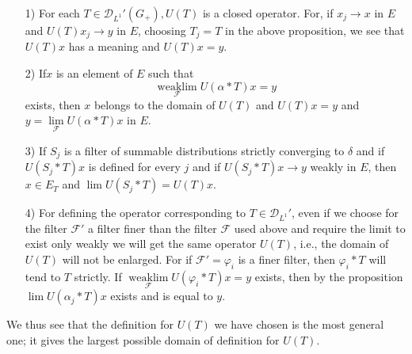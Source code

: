 \begin{itemize}
\item [1)] For each $T\in\mathscr{D}_{L^1}'(G_+), U(T)$ is a closed
  operator. For, if $x_j\to x$ in $E$ and $U(T)x_j\to y$ in $E$,
  choosing $T_j=T$ in the above proposition, we see that $U(T)x$ has a
  meaning and $U(T)x=y$. 
\item [2)] If\pageoriginale $x$ is an element of $E$ such that 
$$
\underset{\mathscr{F}}{\text{weak} \lim} U(\alpha *T)x=y
$$
exists, then $x$ belongs to the domain of $U(T)$ and $U(T)x=y$ and $y=
\lim\limits_{\mathscr{F}} U(\alpha *T)x$ in $E$. 
\item [3)] If $S_j$ is a filter of summable distributions strictly
  converging to $\delta$ and if $U(S_j*T)x$ is defined for every $j$
  and if $U(S_j*T)x\to y$ weakly in $E$, then $x\in E_T$ and $\lim
  U(S_j*T)=U(T)x$.
\item [4)] For defining the operator corresponding to $T\in
  \mathscr{D}_{L^1}'$, even if we choose for the filter $\mathscr{F}'$
  a filter finer than the filter $\mathscr{F}$ used above and require
  the limit to exist only weakly we will get the same operator $U(T)$,
  i.e., the domain of $U(T)$ will not be enlarged. For if
  $\mathscr{F}'=\varphi_i$ is a finer filter, then $\varphi_i*T$ will
  tend to $T$ strictly. If $\underset{\mathscr{F}}{\text{weak} \lim}
  U(\varphi_i*T)x=y$ exists, then by the proposition $\lim U(\alpha_j
  *T)x$ exists and is equal to $y$. 
\end{itemize}

We thus see that the definition for $U(T)$ we have chosen is the most
general one; it gives the largest possible domain of definition for
$U(T)$. 


